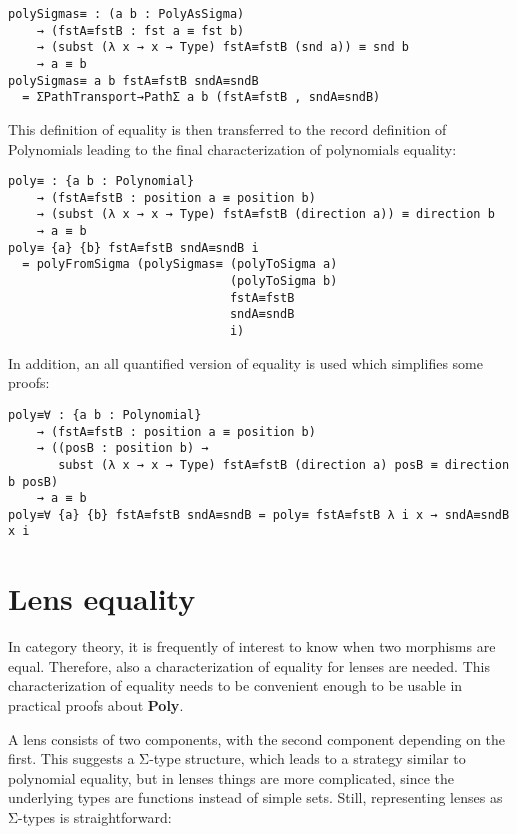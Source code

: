 \begin{verbatim}
polySigmas≡ : (a b : PolyAsSigma)
    → (fstA≡fstB : fst a ≡ fst b)
    → (subst (λ x → x → Type) fstA≡fstB (snd a)) ≡ snd b
    → a ≡ b
polySigmas≡ a b fstA≡fstB sndA≡sndB
  = ΣPathTransport→PathΣ a b (fstA≡fstB , sndA≡sndB)
\end{verbatim}

This definition of equality is then transferred to the record definition of Polynomials leading to the final characterization of polynomials equality:
\begin{verbatim}
poly≡ : {a b : Polynomial}
    → (fstA≡fstB : position a ≡ position b)
    → (subst (λ x → x → Type) fstA≡fstB (direction a)) ≡ direction b
    → a ≡ b
poly≡ {a} {b} fstA≡fstB sndA≡sndB i
  = polyFromSigma (polySigmas≡ (polyToSigma a)
                               (polyToSigma b) 
                               fstA≡fstB 
                               sndA≡sndB 
                               i)
\end{verbatim}

In addition, an all quantified version of equality is used which simplifies some proofs:
\begin{verbatim}
poly≡∀ : {a b : Polynomial}
    → (fstA≡fstB : position a ≡ position b)
    → ((posB : position b) → 
       subst (λ x → x → Type) fstA≡fstB (direction a) posB ≡ direction b posB)
    → a ≡ b
poly≡∀ {a} {b} fstA≡fstB sndA≡sndB = poly≡ fstA≡fstB λ i x → sndA≡sndB x i

\end{verbatim}

\section{Lens equality}
In category theory, it is frequently of interest to know when two morphisms are equal. Therefore, also a characterization of equality for lenses are needed. 
This characterization of equality needs to be convenient enough to be usable in practical proofs about \textbf{Poly}.

A lens consists of two components, with the second component depending on the first. 
This suggests a Σ-type structure, which leads to a strategy similar to polynomial equality, but in lenses things are more complicated, since the underlying types are functions instead of simple sets.
Still, representing lenses as Σ-types is straightforward:


